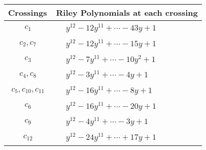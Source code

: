 \documentclass[1p]{elsarticle_modified}
\theoremstyle{definition}
\begin{document}
\begin{tabular}{m{50pt}|m{274pt}}
Crossings & \hspace{64pt}Riley Polynomials at each crossing \\
\hline $$\begin{aligned}c_{1}\end{aligned}$$&$\begin{aligned}
&y^{12}-12 y^{11}+\cdots-43 y+1
\end{aligned}$\\
\hline $$\begin{aligned}c_{2},c_{7}\end{aligned}$$&$\begin{aligned}
&y^{12}-12 y^{11}+\cdots-15 y+1
\end{aligned}$\\
\hline $$\begin{aligned}c_{3}\end{aligned}$$&$\begin{aligned}
&y^{12}-7 y^{11}+\cdots-10 y^2+1
\end{aligned}$\\
\hline $$\begin{aligned}c_{4},c_{8}\end{aligned}$$&$\begin{aligned}
&y^{12}-3 y^{11}+\cdots-4 y+1
\end{aligned}$\\
\hline $$\begin{aligned}c_{5},c_{10},c_{11}\end{aligned}$$&$\begin{aligned}
&y^{12}-16 y^{11}+\cdots-8 y+1
\end{aligned}$\\
\hline $$\begin{aligned}c_{6}\end{aligned}$$&$\begin{aligned}
&y^{12}-16 y^{11}+\cdots-20 y+1
\end{aligned}$\\
\hline $$\begin{aligned}c_{9}\end{aligned}$$&$\begin{aligned}
&y^{12}-4 y^{11}+\cdots-3 y+1
\end{aligned}$\\
\hline $$\begin{aligned}c_{12}\end{aligned}$$&$\begin{aligned}
&y^{12}-24 y^{11}+\cdots+17 y+1
\end{aligned}$\\
\hline
\end{tabular}\\~\\
\end{document}
